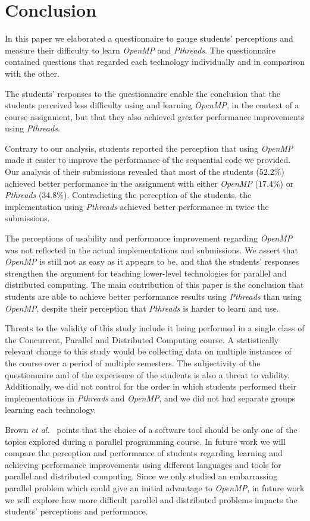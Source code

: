 \section{Conclusion}
\label{sec:conclusion}

In this paper we elaborated a questionnaire to gauge students' perceptions and
measure their difficulty to learn \textit{OpenMP} and \textit{Pthreads}.  The
questionnaire contained questions that regarded each technology individually
and in comparison with the other.

The students' responses to the questionnaire enable the conclusion that the
students perceived less difficulty using and learning \textit{OpenMP}, in the
context of a course assignment, but that they also achieved greater performance
improvements using \textit{Pthreads}.

Contrary to our analysis, students reported the perception that using
\textit{OpenMP} made it easier to improve the performance of the sequential
code we provided.  Our analysis of their submissions revealed that most
of the students ($52.2\%$) achieved better performance in the assignment with
either \textit{OpenMP} ($17.4\%$) or \textit{Pthreads} ($34.8\%$).
Contradicting the perception of the students, the implementation using
\textit{Pthreads} achieved better performance in twice the submissions.

The perceptions of usability and performance improvement regarding
\textit{OpenMP} was not reflected in the actual implementations and
submissions. We assert that \textit{OpenMP} is still not as easy as it appears
to be, and that the students' responses strengthen the argument for teaching
lower-level technologies for parallel and distributed computing.
The main contribution of this paper is the conclusion that students
are able to achieve better performance results using \textit{Pthreads}
than using \textit{OpenMP}, despite their perception that \textit{Pthreads}
is harder to learn and use.

Threats to the validity of this study include it being performed in a single
class of the Concurrent, Parallel and Distributed Computing course.  A
statistically relevant change to this study would be collecting data on
multiple instances of the course over a period of multiple semesters. The
subjectivity of the questionnaire and of the experience of the students is also
a threat to validity. Additionally, we did not control for the order in which
students performed their implementations in \textit{Pthreads} and
\textit{OpenMP}, and we did not had separate groups learning each technology.

Brown \textit{et al.}~\cite{Brown:2010:SPC:1971681.1971689} points that the
choice of a software tool should be only one of the topics explored during a
parallel programming course.  In future work we will compare the perception and
performance of students regarding learning and achieving performance
improvements using different languages and tools for parallel and distributed
computing.  Since we only studied an embarrassing parallel problem which could
give an initial advantage to \textit{OpenMP}, in future work we will explore
how more difficult parallel and distributed problems impacts the students'
perceptions and performance.
